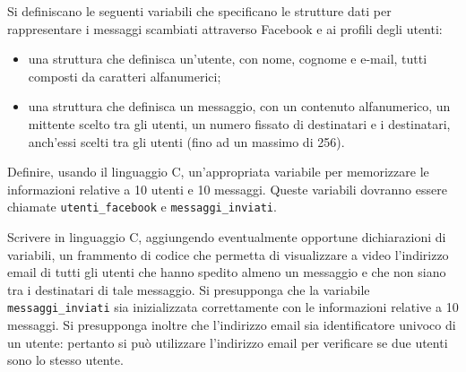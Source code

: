 \begin{Exercise}[label={ex:facebook}]
  \Question Si definiscano le seguenti variabili che specificano le strutture dati per rappresentare i messaggi scambiati attraverso Facebook e ai profili degli utenti:
  		\begin{itemize}
  				\item una struttura che definisca un'utente, con nome, cognome e e-mail, tutti composti da caratteri alfanumerici;
  				\item una struttura che definisca un messaggio, con un contenuto alfanumerico, un mittente scelto tra gli utenti, un numero fissato di destinatari e i destinatari, anch'essi scelti tra gli utenti (fino ad un massimo di 256).
  		\end{itemize}

		\Question Definire, usando il linguaggio C, un'appropriata variabile per memorizzare le informazioni relative a 10 utenti e 10 messaggi. Queste variabili dovranno essere chiamate \texttt{utenti\_facebook} e \texttt{messaggi\_inviati}.

		\Question Scrivere in linguaggio C, aggiungendo eventualmente opportune dichiarazioni di variabili, un frammento di codice che permetta di visualizzare a video l'indirizzo email di tutti gli utenti che hanno spedito almeno un messaggio e che non siano tra i destinatari di tale messaggio. Si presupponga che la variabile \texttt{messaggi\_inviati} sia inizializzata correttamente con le informazioni relative a 10 messaggi. Si presupponga inoltre che l'indirizzo email sia identificatore univoco di un utente: pertanto si può utilizzare l'indirizzo email per verificare se due utenti sono lo stesso utente.
		
\end{Exercise}

